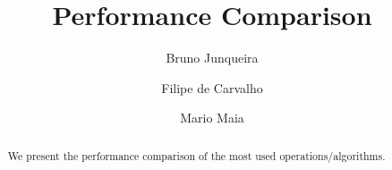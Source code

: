 \documentclass[a4paper]{article}
\title{Performance Comparison}
\author{Bruno Junqueira \and Filipe de Carvalho \and Mario Maia}
\begin{document}
\maketitle

\begin{abstract}
We present the performance comparison of the most used operations/algorithms.

\end{abstract}


\end{document}
